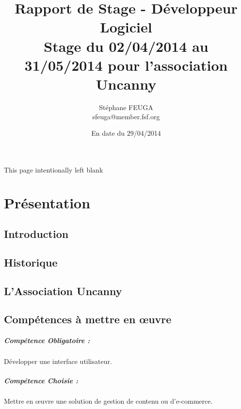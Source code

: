 \documentclass[11pt,a4paper]{report}
\author{Stéphane FEUGA\\{\small sfeuga@member.fsf.org}}
\title{{\Huge Rapport de Stage - Développeur Logiciel}\\
{\normalsize Stage du 02/04/2014 au 31/05/2014 pour l'association Uncanny}}
\date {En date du 29/04/2014}
\begin{document}
\maketitle

\begin{center}
This page intentionally left blank
\thispagestyle{empty}
\end{center}

\tableofcontents

\chapter{Présentation}
	\section{Introduction}
		\paragraph*{}
	\section{Historique}
		\paragraph*{}
	\section{L'Association Uncanny}
		\paragraph*{}
	\section{Compétences à mettre en œuvre}
		\paragraph*{\indent Compétence Obligatoire :} Développer une interface utilisateur.
		\paragraph*{\indent Compétence Choisie :} Mettre en œuvre une solution de gestion de contenu ou d’e-commerce.
\end{document}
